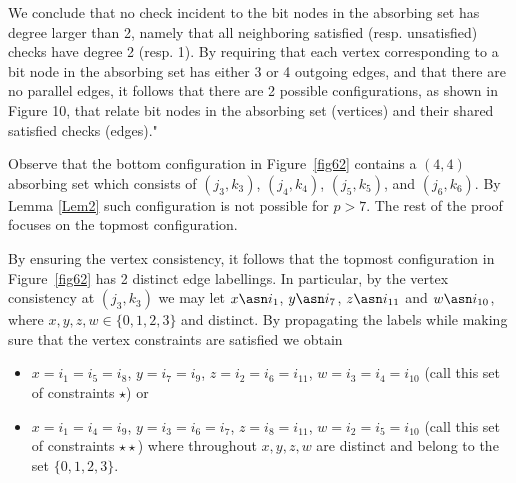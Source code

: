 We conclude that no check incident to the bit nodes in the
absorbing set has degree larger than 2, namely that all
neighboring satisfied (resp. unsatisfied) checks have degree 2
(resp. 1). By requiring that each vertex corresponding to a bit
node in the absorbing set has either 3 or 4 outgoing edges, and
that there are no parallel edges, it follows that there are 2
possible configurations, as shown in Figure 10, that relate bit
nodes in the absorbing set (vertices) and their shared satisfied
checks (edges)."

Observe that the bottom configuration in Figure~\ref{fig62}
contains a $(4,4)$ absorbing set which consists of $(j_3,k_3)$,
$(j_4,k_4)$, $(j_5,k_5)$, and $(j_6,k_6)$. By Lemma \ref{Lem2}
such configuration is not possible for $p>7$. The rest of the
proof focuses on the topmost configuration.

 By ensuring the vertex consistency, it follows that the topmost
configuration in Figure~\ref{fig62} has 2 distinct edge
labellings. In particular, by the vertex consistency at
$(j_3,k_3)$ we may let $x \asn i_1$, $y \asn i_7$, $z \asn i_{11}$
and $w \asn i_{10}$, where $x,y,z,w \in \{0,1,2,3\}$ and distinct.
By propagating the labels while making sure that the vertex
constraints are satisfied we obtain


\begin{itemize}
\item $x=i_1=i_5=i_8$, $y=i_7=i_9$, $z=i_2=i_6=i_{11}$,
$w=i_3=i_4=i_{10}$ (call this set of constraints $\star$) or \item
$x=i_1=i_4=i_9$, $y=i_3=i_6=i_7$, $z=i_8=i_{11}$,
$w=i_2=i_5=i_{10}$ (call this set of constraints $\star\star$)
where throughout $x,y,z,w$ are distinct and belong to the set
$\{0,1,2,3\}$.
\end{itemize}

